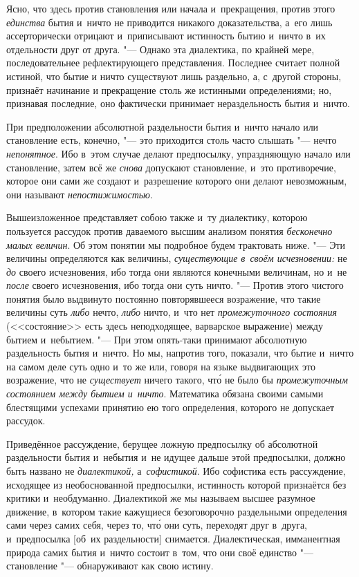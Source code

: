 Ясно, что здесь против становления или начала и~прекращения, против этого {\em
единства} бытия и~ничто не приводится никакого доказательства, а~его лишь
ассерторически отрицают и~приписывают истинность бытию и~ничто в~их отдельности
друг от друга. "--- Однако эта диалектика, по крайней мере, последовательнее
рефлектирующего представления. Последнее считает полной истиной, что бытие и
ничто существуют лишь раздельно, а, с~другой стороны, признаёт начинание и
прекращение столь же истинными определениями; но, признавая последние, оно
фактически принимает нераздельность бытия и~ничто.

При предположении абсолютной раздельности бытия и~ничто начало или становление
есть, конечно, "--- это приходится столь часто слышать "--- нечто
{\em непонятное}. Ибо в~этом случае делают предпосылку, упраздняющую начало
или становление, затем всё же {\em снова} допускают становление, и~это
противоречие, которое они сами же создают и~разрешение которого они делают
невозможным, они называют {\em непостижимостью}.

Вышеизложенное представляет собою также и~ту диалектику, которою пользуется
рассудок против даваемого высшим анализом понятия {\em бесконечно малых
величин}. Об этом понятии мы подробное будем трактовать ниже. "--- Эти величины
определяются как величины, {\em существующие} {\em в~своём исчезновении:} не {\em до}
своего исчезновения, ибо тогда они являются конечными величинам, но и~не
{\em после} своего исчезновения, ибо тогда они суть ничто. "--- Против этого
чистого понятия было выдвинуто постоянно повторявшееся возражение, что такие
величины суть {\em либо} нечто, {\em либо} ничто, и~что нет {\em промежуточного
состояния} (<<состояние>> есть здесь неподходящее, варварское выражение) между
бытием и~небытием. "--- При этом опять-таки принимают абсолютную раздельность
бытия и~ничто. Но мы, напротив того, показали, что бытие и~ничто на самом деле
суть одно и~то же или, говоря на языке выдвигающих это возражение, что не
{\em существует} ничего такого, чт\'{о} не было бы {\em промежуточным
состоянием между бытием и~ничто}. Математика обязана своими самыми блестящими
успехами принятию ею того определения, которого не допускает рассудок.

Приведённое рассуждение, берущее ложную предпосылку об абсолютной раздельности
бытия и~небытия и~не идущее дальше этой предпосылки, должно быть названо не
{\em диалектикой,} а~{\em софистикой}. Ибо софистика есть рассуждение,
исходящее из необоснованной предпосылки, истинность которой признаётся без
критики и~необдуманно. Диалектикой же мы называем высшее разумное движение,
в~котором такие кажущиеся безоговорочно раздельными определения сами через
самих себя, через то, чт\'{о} они суть, переходят друг в~друга, и~предпосылка
[об~их раздельности] снимается. Диалектическая, имманентная природа самих бытия
и~ничто состоит в~том, что они своё единство "--- становление "--- обнаруживают
как свою истину.

